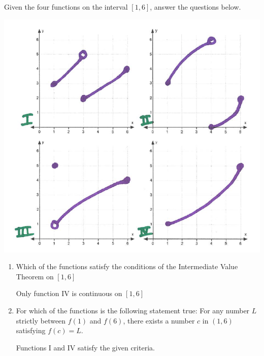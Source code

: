 \documentclass[nooutcomes, handout]{ximera}
\begin{document}
\begin{problem}
	Given the four functions on the interval $[1,6]$, answer the questions below.
	
	\begin{image}
	\includegraphics[scale=.6]{Figure2.png}
	\end{image}

	\begin{enumerate}
	\item Which of the functions satisfy the conditions of the Intermediate Value Theorem on $[1,6]$
		\begin{freeResponse}
		Only function IV is continuous on $[1,6]$
		\end{freeResponse}
	\item For which of the functions is the following statement true:  For any number $L$ strictly between $f(1)$ and $f(6)$, there exists a number $c$ in $(1,6)$ satisfying $f(c)=L$.
		\begin{freeResponse}
		Functions I and IV satisfy the given criteria.
		\end{freeResponse}

	\end{enumerate}
\end{problem}
\end{document}
